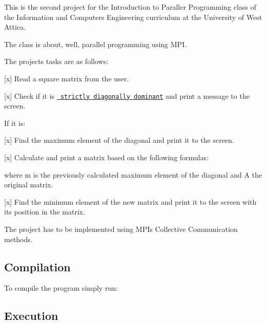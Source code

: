This is the second project for the Introduction to Paraller Programming class of the Information and Computers Engineering curriculum at the University of West Attica.

The class is about, well, parallel programming using M\+PI.

The project\textquotesingle{}s tasks are as follows\+:


\begin{DoxyItemize}
\item \mbox{[}x\mbox{]} Read a square matrix from the user.
\item \mbox{[}x\mbox{]} Check if it is \href{https://en.wikipedia.org/wiki/Diagonally_dominant_matrix}{\texttt{ strictly diagonally dominant}} and print a message to the screen.
\end{DoxyItemize}

If it is\+:


\begin{DoxyItemize}
\item \mbox{[}x\mbox{]} Find the maximum element of the diagonal and print it to the screen.
\item \mbox{[}x\mbox{]} Calculate and print a matrix based on the following formulas\+:
\end{DoxyItemize}

 

 

where {\ttfamily m} is the previously calculated maximum element of the diagonal and {\ttfamily A} the original matrix.


\begin{DoxyItemize}
\item \mbox{[}x\mbox{]} Find the minimum element of the new matrix and print it to the screen with it\textquotesingle{}s position in the matrix.
\end{DoxyItemize}

The project has to be implemented using M\+PI\textquotesingle{}s Collective Communication methods.

\subsection*{Compilation}

To compile the program simply run\+:


\begin{DoxyCode}{0}
\end{DoxyCode}


\subsection*{Execution}

